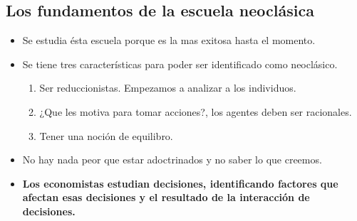 \begin{multicols}{2}
    \subsection*{Los fundamentos de la escuela neoclásica}

    \begin{itemize}
	\item Se estudia ésta escuela porque es la mas exitosa hasta el momento.
	\item Se tiene tres características para poder ser identificado como neoclásico.
	\begin{enumerate}[1.]
	    \item Ser reduccionistas. Empezamos a analizar a los individuos.
	    \item ¿Que les motiva para tomar acciones?, los agentes deben ser racionales. 
	    \item Tener una noción de equilibro.
	\end{enumerate}
	\item No hay nada peor que estar adoctrinados y no saber lo que creemos.
	\item \textbf{Los economistas estudian decisiones, identificando factores que afectan esas decisiones y el resultado de la interacción de decisiones.}
    \end{itemize}




\end{multicols}
